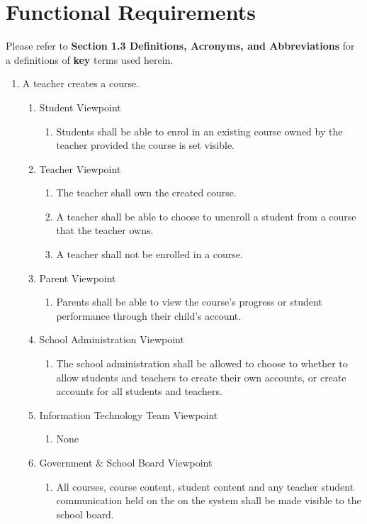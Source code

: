 \documentclass[]{article}
\begin{document}

\section{Functional Requirements}
\label{sec:functional_requirements}

Please refer to \textbf{Section 1.3 Definitions, Acronyms, and Abbreviations}
for a definitions of \textbf{key} terms used herein.


\begin{enumerate}[{BE}1.]
	\item A teacher creates a course.
	\begin{enumerate}[{VP1}.1]
		\item Student Viewpoint
			\begin{enumerate}
				\item Students shall be able to enrol in an existing course owned by the
teacher provided the course is set visible.
			\end{enumerate}
		\item Teacher Viewpoint
			\begin{enumerate}
			    \item The teacher shall own the created course.
				\item A teacher shall be able to choose to unenroll a student from a course
that the teacher owns.
				\item A teacher shall not be enrolled in a course.
			\end{enumerate}
		\item Parent Viewpoint
			\begin{enumerate}
				\item Parents shall be able to view the course's progress or student performance through their child's account.
			\end{enumerate}
		\item School Administration Viewpoint
			\begin{enumerate}
				\item The school administration shall be allowed to choose to whether to allow students and teachers
to create their own accounts, or create accounts for all students and teachers.
			\end{enumerate}
		\item Information Technology Team Viewpoint
			\begin{enumerate}
				\item None
			\end{enumerate}
		\item Government \& School Board Viewpoint
			\begin{enumerate}
				\item All courses, course content, student content and any teacher student
communication held on the on the system shall be made visible to the school
board.
			\end{enumerate}
	\end{enumerate}


\end{enumerate}
\end{document}
